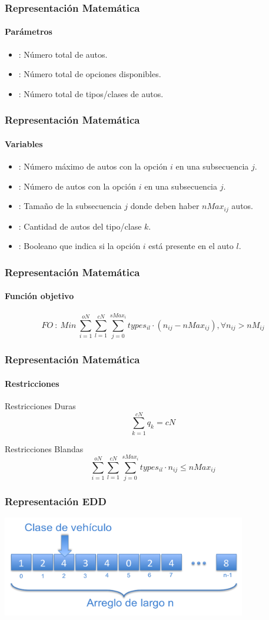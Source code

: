 \frame
{
\frametitle{Representación Matemática}
\framesubtitle{Parámetros}
    \begin{itemize}
        \item {}: Número total de autos.
        \item {}: Número total de opciones disponibles.
        \item {}: Número total de tipos/clases de autos.
    \end{itemize}
}

\frame
{
\frametitle{Representación Matemática}
\framesubtitle{Variables}
    \begin{itemize}
        \item {}: Número máximo de autos con la opción $i$ en una subsecuencia $j$.
        \item {}: Número de autos con la opción $i$ en una subsecuencia $j$.
        \item {}: Tamaño de la subsecuencia $j$ donde deben haber $nMax_{ij}$ autos.
        \item {}: Cantidad de autos del tipo/clase $k$.
        \item {}: Booleano que indica si la opción $i$ está presente en el auto $l$.
    \end{itemize}
}

\frame
{
\frametitle{Representación Matemática}
\framesubtitle{Función objetivo}

    $$FO\ :\ Min\ \sum\limits_{i=1}^{oN} \sum\limits_{l=1}^{cN} \sum\limits_{j=0}^{sMax_{i}} types_{il}\cdot (n_{ij} - nMax_{ij}), \forall n_{ij} > nM_{ij}$$
}
\frame
{
\frametitle{Representación Matemática}
\framesubtitle{Restricciones}

Restricciones Duras
    $$\sum\limits_{k=1}^{cN} q_{k} = cN$$

Restricciones Blandas
    $$\sum\limits_{i=1}^{oN} \sum\limits_{l=1}^{cN} \sum\limits_{j=0}^{sMax_{i}} types_{il}\cdot n_{ij} \leq nMax_{ij}$$
}

\frame
{
\frametitle{Representación EDD}
\begin{center}
    \includegraphics[width=0.8\textwidth]{img/representacion}
\end{center}
}

